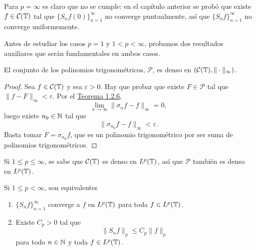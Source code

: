 \documentclass[a4paper, 12pt, oneside]{book}
\begin{document}
Para $p = \infty$ es claro que no se cumple: en el capítulo anterior se probó que existe $f\in\mathcal{C}(\mathbb T)$ tal que $\{S_nf(0)\}_{n=1}^\infty$ no converge puntualmente, así que $\{S_nf\}_{n=1}^\infty$ no converge uniformemente.

Antes de estudiar los casos $p=1$ y $1<p<\infty$, probamos dos resultados auxiliares que serán fundamentales en ambos casos.

\begin{lemma}
    El conjunto de los polinomios trigonométricos, $\mathcal{P}$, es denso en $(\mathcal{C}(\mathbb T),\|\cdot\|_\infty)$.
\end{lemma}

\begin{proof}
    Sea $f \in \mathcal{C}(\mathbb T)$ y sea $\varepsilon > 0$. Hay que probar que existe $F \in \mathcal{P}$ tal que $\|f-F\|_\infty < \varepsilon$. Por el \hyperref[1.2.6]{\color{blue}Teorema 1.2.6},
    \[\lim_{n \to \infty} \|\sigma_nf-f\|_\infty = 0,\]
    luego existe $n_0 \in \mathbb N$ tal que
    \[\|\sigma_{n_0}f-f\|_\infty < \varepsilon.\]
    Basta tomar $F = \sigma_{n_0}f$, que es un polinomio trigonométrico por ser suma de polinomios trigonométricos.
\end{proof}

Si $1 \leq p \leq \infty$, se sabe que $\mathcal{C}(\mathbb T)$ es denso en $L^p(\mathbb T)$, así que $\mathcal{P}$ también es denso en $L^p(\mathbb T)$.

\begin{lemma}\label{3.0.2}
    Si $1 \leq p < \infty$, son equivalentes
    \begin{enumerate}
        \item $\{S_nf\}_{n=1}^\infty$ converge a $f$ en $L^p(\mathbb T)$ para toda $f \in L^p(\mathbb T)$.
        \item Existe $C_p > 0$ tal que
        \[\|S_nf\|_{p} \leq C_p \|f\|_{p}\]
        para todo $n \in \mathbb N$ y toda $f \in L^p(\mathbb T)$.
    \end{enumerate}
\end{lemma}
\end{document}
